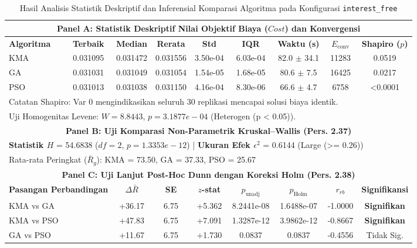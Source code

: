 \begin{table}[htbp]
\centering
\caption{Hasil Analisis Statistik Deskriptif dan Inferensial Komparasi Algoritma pada Konfigurasi \texttt{interest_free}}
\label{tab:stats_interest_free}
\small
\begin{tabular}{lcccccccc}
\toprule
\multicolumn{9}{c}{\textbf{Panel A: Statistik Deskriptif Nilai Objektif Biaya ($Cost$) dan Konvergensi}} \\
\midrule
\textbf{Algoritma} & \textbf{Terbaik} & \textbf{Median} & \textbf{Rerata} & \textbf{Std} & \textbf{IQR} & \textbf{Waktu (s)} & \textbf{$E_{\text{conv}}$} & \textbf{Shapiro ($p$)} \\
\midrule
KMA & 0.031095 & 0.031472 & 0.031556 & 3.50e-04 & 6.03e-04 & 82.0 $\pm$ 34.1 & 11283 & 0.0519 \\
GA & 0.031031 & 0.031049 & 0.031054 & 1.54e-05 & 1.68e-05 & 80.6 $\pm$ 7.5 & 16425 & 0.0217 \\
PSO & 0.031013 & 0.031038 & 0.031150 & 4.16e-04 & 8.30e-06 & 66.6 $\pm$ 4.7 & 6758 & <0.0001 \\
\midrule
\multicolumn{9}{l}{\footnotesize *Catatan Shapiro: Var 0 mengindikasikan seluruh 30 replikasi mencapai solusi biaya identik.} \\
\multicolumn{9}{l}{\footnotesize Uji Homogenitas Levene: $W = 8.8443$, $p = 3.1877e-04$ (Heterogen (p < 0.05)).} \\
\midrule
\multicolumn{9}{c}{\textbf{Panel B: Uji Komparasi Non-Parametrik Kruskal--Wallis (Pers. 2.37)}} \\
\midrule
\multicolumn{9}{l}{\textbf{Statistik $H$} = 54.6838 \quad ($df = 2$, $p = 1.3353e-12$) \quad | \quad \textbf{Ukuran Efek $\epsilon^2$} = 0.6144 (Large (>= 0.26))} \\
\multicolumn{9}{l}{\footnotesize Rata-rata Peringkat ($\bar{R}_g$): KMA = 73.50, GA = 37.33, PSO = 25.67} \\
\midrule
\multicolumn{9}{c}{\textbf{Panel C: Uji Lanjut Post-Hoc Dunn dengan Koreksi Holm (Pers. 2.38)}} \\
\midrule
\multicolumn{2}{l}{\textbf{Pasangan Perbandingan}} & \textbf{$\Delta \bar{R}$} & \textbf{SE} & \textbf{$z$-stat} & \textbf{$p_{\text{unadj}}$} & \textbf{$p_{\text{Holm}}$} & \textbf{$r_{rb}$} & \textbf{Signifikansi} \\
\midrule
\multicolumn{2}{l}{KMA vs GA} & +36.17 & 6.75 & +5.362 & 8.2441e-08 & 1.6488e-07 & -1.0000 & \textbf{Signifikan} \\
\multicolumn{2}{l}{KMA vs PSO} & +47.83 & 6.75 & +7.091 & 1.3287e-12 & 3.9862e-12 & -0.8667 & \textbf{Signifikan} \\
\multicolumn{2}{l}{GA vs PSO} & +11.67 & 6.75 & +1.730 & 0.0837 & 0.0837 & -0.4556 & Tidak Sig. \\
\bottomrule
\end{tabular}
\end{table}